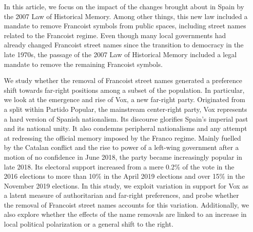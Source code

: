 \documentclass[12pt, notitlepage]{article}
\begin{document}

In this article, we focus on the impact of the changes brought about in Spain by the 2007 Law of Historical Memory.
Among other things, this new law included a mandate to remove Francoist symbols from public spaces, including street names related to the Francoist regime.
Even though many local governments had already changed Francoist street names since the transition to democracy in the late 1970s, the passage of the 2007 Law of Historical Memory included a legal mandate to remove the remaining Francoist symbols.

We study whether the removal of Francoist street names generated a preference shift towards far-right positions among a subset of the population.
In particular, we look at the emergence and rise of Vox, a new far-right party.
Originated from a split within Partido Popular, the mainstream center-right party, Vox represents a hard version of Spanish nationalism. Its discourse glorifies Spain's imperial past and its national unity. It also condemns peripheral nationalisms and any attempt at redressing the official memory imposed by the Franco regime.
Mainly fuelled by the Catalan conflict and the rise to power of a left-wing government after a motion of no confidence in June 2018, the party became increasingly popular in late 2018.
Its electoral support increased from a mere 0.2\% of the vote in the 2016 elections to more than 10\% in the April 2019 elections and over 15\% in the November 2019 elections.
In this study, we exploit variation in support for Vox as a latent measure of authoritarian and far-right preferences, and probe whether the removal of Francoist street names accounts for this variation.
Additionally, we also explore whether the effects of the name removals are linked to an increase in local political polarization or a general shift to the right.
\end{document}
